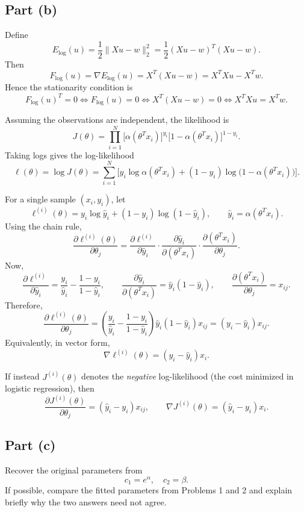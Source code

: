 \subsection*{Part (b)}
Define
\[
	E_{\log}(u)=\frac{1}{2}\|Xu-w\|_2^2=\frac{1}{2}(Xu-w)^T(Xu-w).
\]
Then
\[
	F_{\log}(u)=\nabla E_{\log}(u)=X^T(Xu-w)=X^TXu-X^Tw.
\]
Hence the stationarity condition is
\[
	F_{\log}(u)^T=0
	\iff F_{\log}(u)=0
	\iff X^T(Xu-w)=0
	\iff X^TXu=X^Tw.
\]

Assuming the observations are independent, the likelihood is
\[
	J(\theta)=\prod_{i=1}^{N}\big[\alpha(\theta^Tx_i)\big]^{y_i}\big[1-\alpha(\theta^Tx_i)\big]^{1-y_i}.
\]
Taking logs gives the log-likelihood
\[
	\ell(\theta)=\log J(\theta)=\sum_{i=1}^{N}\Big[y_i\log\alpha(\theta^Tx_i)+(1-y_i)\log\big(1-\alpha(\theta^Tx_i)\big)\Big].
\]

For a single sample $(x_i,y_i)$, let
\[
	\ell^{(i)}(\theta)=y_i\log\hat{y}_i+(1-y_i)\log(1-\hat{y}_i),
	\qquad
	\hat{y}_i=\alpha(\theta^Tx_i).
\]
Using the chain rule,
\[
	\frac{\partial \ell^{(i)}(\theta)}{\partial\theta_j}
	=
	\frac{\partial \ell^{(i)}}{\partial \hat{y}_i}
	\cdot
	\frac{\partial \hat{y}_i}{\partial (\theta^Tx_i)}
	\cdot
	\frac{\partial (\theta^Tx_i)}{\partial \theta_j}.
\]
Now,
\[
	\frac{\partial \ell^{(i)}}{\partial \hat{y}_i}
	=
	\frac{y_i}{\hat{y}_i}-\frac{1-y_i}{1-\hat{y}_i},
	\qquad
	\frac{\partial \hat{y}_i}{\partial (\theta^Tx_i)}=\hat{y}_i(1-\hat{y}_i),
	\qquad
	\frac{\partial (\theta^Tx_i)}{\partial \theta_j}=x_{ij}.
\]
Therefore,
\[
	\frac{\partial \ell^{(i)}(\theta)}{\partial\theta_j}
	=
	\left(\frac{y_i}{\hat{y}_i}-\frac{1-y_i}{1-\hat{y}_i}\right)\hat{y}_i(1-\hat{y}_i)x_{ij}
	=
	(y_i-\hat{y}_i)x_{ij}.
\]
Equivalently, in vector form,
\[
	\nabla \ell^{(i)}(\theta)=(y_i-\hat{y}_i)x_i.
\]

If instead $J^{(i)}(\theta)$ denotes the \emph{negative} log-likelihood (the cost minimized in logistic regression), then
\[
	\frac{\partial J^{(i)}(\theta)}{\partial\theta_j}=(\hat{y}_i-y_i)x_{ij},
	\qquad
	\nabla J^{(i)}(\theta)=(\hat{y}_i-y_i)x_i.
\]



\subsection*{Part (c)}
Recover the original parameters from
\[ c_1 = e^\alpha, \quad c_2 = \beta. \]
If possible, compare the fitted parameters from Problems 1 and 2 and explain briefly why the two answers need not agree.

